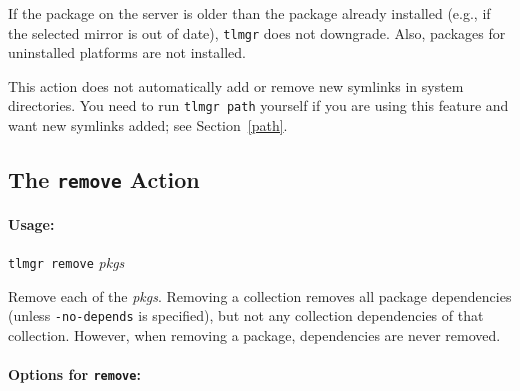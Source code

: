 \documentclass[11pt]{article}
\begin{document}
\noindent
If the package on the server is older than the package
already installed (e.g., if the selected mirror is out of
date), \texttt{tlmgr} does not downgrade. Also, packages for
uninstalled platforms are not installed.

This action does not automatically add or remove
new symlinks in system directories. You need to run
\texttt{tlmgr path} yourself if you are using this feature
and want new symlinks added; see Section~\ref{path}.

\clearpage

\subsection{The {\tt remove} Action}
\label{remove}

\paragraph{Usage:}
\begin{list}{}{}
\item  \texttt{tlmgr remove} \textsl{pkgs}
\end{list}

Remove each of the \textsl{pkgs}. Removing a collection
removes all package dependencies (unless \texttt{-no-depends}
is specified), but not any collection dependencies of that
collection. However, when removing a package, dependencies
are never removed.



\paragraph{Options for \mdseries\texttt{remove}:}
\end{document}
